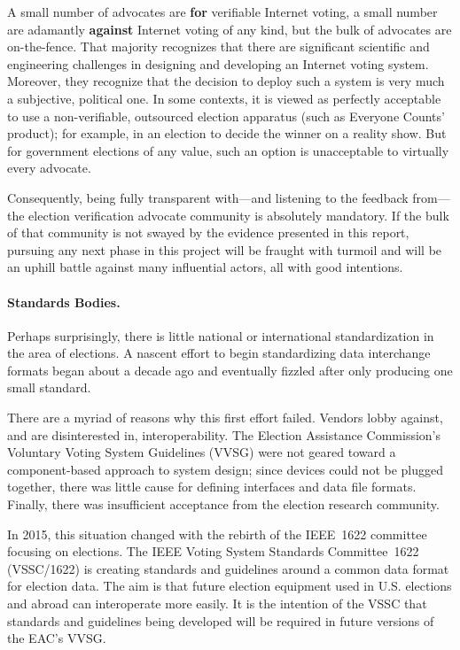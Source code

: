 A small number of advocates are \textbf{for} verifiable Internet
voting, a small number are adamantly \textbf{against} Internet voting
of any kind, but the bulk of advocates are on-the-fence. That majority
recognizes that there are significant scientific and engineering
challenges in designing and developing an Internet voting system.
Moreover, they recognize that the decision to deploy such a system is
very much a subjective, political one. In some contexts, it is viewed
as perfectly acceptable to use a non-verifiable, outsourced election
apparatus (such as Everyone Counts' product); for example, in an election
to decide the winner on a reality show. But for government elections
of any value, such an option is unacceptable to virtually every
advocate.

Consequently, being fully transparent with---and listening to the
feedback from---the election verification advocate community is
absolutely mandatory. If the bulk of that community is not swayed by
the evidence presented in this report, pursuing any next phase in this
project will be fraught with turmoil and will be an uphill battle
against many influential actors, all with good intentions.

\paragraph{Standards Bodies.} Perhaps surprisingly, there is little
national or international standardization in the area of elections. A
nascent effort to begin standardizing data interchange formats began
about a decade ago and eventually fizzled after only producing one
small standard.

There are a myriad of reasons why this first effort failed. Vendors
lobby against, and are disinterested in, interoperability. The
Election Assistance Commission's Voluntary Voting System Guidelines
(VVSG) were not geared toward a component-based approach to system
design; since devices could not be plugged together, there was little 
cause for defining interfaces and data file formats. Finally, there
was insufficient acceptance from the election research community.

In 2015, this situation changed with the rebirth of the IEEE~1622
committee focusing on elections. The IEEE Voting System Standards
Committee~1622 (VSSC/1622) is creating standards and guidelines around
a common data format for election data. The aim is that future
election equipment used in U.S. elections and abroad can interoperate
more easily. It is the intention of the VSSC that standards and
guidelines being developed will be required in future versions of the
EAC's VVSG.

